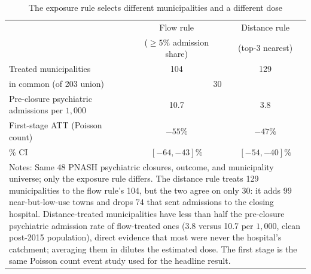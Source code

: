 \begin{table}[!htbp]\centering
\caption{The exposure rule selects different municipalities and a different dose}
\label{tab:flow-vs-distance-firststage}
\small
\begin{tabular}{lcc}
\toprule
 & Flow rule & Distance rule \\
 & ($\geq 5\%$ admission share) & (top-3 nearest) \\
\midrule
Treated municipalities & 104 & 129 \\
\quad in common (of 203 union) & \multicolumn{2}{c}{30} \\
Pre-closure psychiatric admissions per $1{,}000$ & 10.7 & 3.8 \\
First-stage ATT (Poisson count) & $-55\%$ & $-47\%$ \\
\quad 95\% CI & $[-64, -43]\%$ & $[-54, -40]\%$ \\
\bottomrule
\multicolumn{3}{p{0.86\textwidth}}{\footnotesize Notes: Same 48 PNASH psychiatric closures, outcome, and municipality universe; only the exposure rule differs. The distance rule treats 129 municipalities to the flow rule's 104, but the two agree on only 30: it adds 99 near-but-low-use towns and drops 74 that sent admissions to the closing hospital. Distance-treated municipalities have less than half the pre-closure psychiatric admission rate of flow-treated ones (3.8 versus 10.7 per $1{,}000$, clean post-2015 population), direct evidence that most were never the hospital's catchment; averaging them in dilutes the estimated dose. The first stage is the same Poisson count event study used for the headline result.}\\
\end{tabular}
\end{table}

